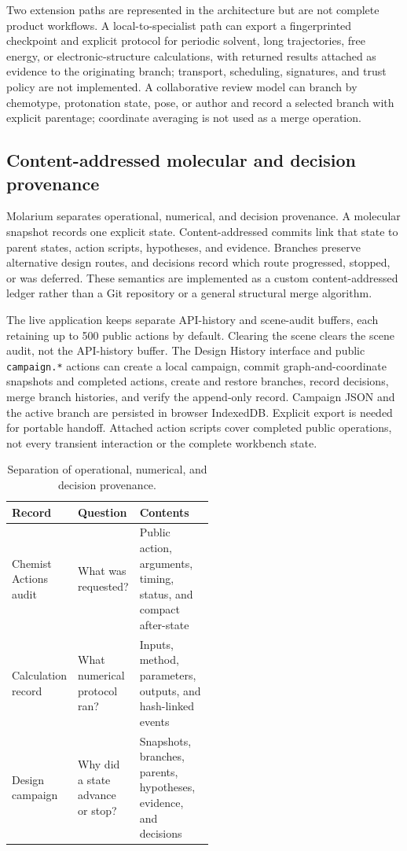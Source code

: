 \documentclass[11pt]{article}
\begin{document}
\begin{small}
Two extension paths are represented in the architecture but are not complete product workflows. A local-to-specialist path can export a fingerprinted checkpoint and explicit protocol for periodic solvent, long trajectories, free energy, or electronic-structure calculations, with returned results attached as evidence to the originating branch; transport, scheduling, signatures, and trust policy are not implemented. A collaborative review model can branch by chemotype, protonation state, pose, or author and record a selected branch with explicit parentage; coordinate averaging is not used as a merge operation.

\subsection{Content-addressed molecular and decision provenance}

Molarium separates operational, numerical, and decision provenance. A molecular snapshot records one explicit state. Content-addressed commits link that state to parent states, action scripts, hypotheses, and evidence. Branches preserve alternative design routes, and decisions record which route progressed, stopped, or was deferred. These semantics are implemented as a custom content-addressed ledger rather than a Git repository or a general structural merge algorithm.

The live application keeps separate API-history and scene-audit buffers, each retaining up to 500 public actions by default. Clearing the scene clears the scene audit, not the API-history buffer. The Design History interface and public \texttt{campaign.*} actions can create a local campaign, commit graph-and-coordinate snapshots and completed actions, create and restore branches, record decisions, merge branch histories, and verify the append-only record. Campaign JSON and the active branch are persisted in browser IndexedDB. Explicit export is needed for portable handoff. Attached action scripts cover completed public operations, not every transient interaction or the complete workbench state.

\begin{table}[htbp]
\centering\small
\caption{Separation of operational, numerical, and decision provenance.}
\label{tab:appA_provenance}
\begin{tabularx}{\linewidth}{@{}p{0.24\linewidth}p{0.27\linewidth}X@{}}
\toprule
\textbf{Record} & \textbf{Question} & \textbf{Contents}\\
\midrule
Chemist Actions audit & What was requested? & Public action, arguments, timing, status, and compact after-state\\
Calculation record & What numerical protocol ran? & Inputs, method, parameters, outputs, and hash-linked events\\
Design campaign & Why did a state advance or stop? & Snapshots, branches, parents, hypotheses, evidence, and decisions\\
\bottomrule
\end{tabularx}
\end{table}


\end{small}
\end{document}
